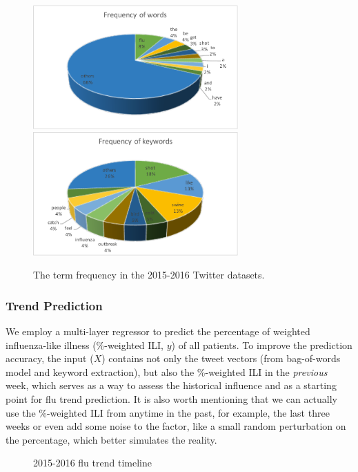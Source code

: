 \documentclass[12pt, oneside]{article}
\begin{document}
\begin{figure}[h]
    \centering
    \includegraphics[width=0.7\textwidth]{fig1b}
    \includegraphics[width=0.7\textwidth]{fig1a}
    \caption{The term frequency in the 2015-2016 Twitter datasets. }
    \label{fig:1}
\end{figure}

\subsubsection{Trend Prediction}

We employ a multi-layer regressor to predict the percentage of weighted influenza-like illness (\%-weighted ILI, $y$) of all patients.
To improve the prediction accuracy, the input ($X$) contains not only the tweet vectors (from bag-of-words model and keyword extraction),
but also the \%-weighted ILI in the \textit{previous} week, which serves as a way to assess the historical influence and as a starting point
for flu trend prediction. It is also worth mentioning that we can actually use the \%-weighted ILI from anytime in the past, for example, the last three weeks
or even add some noise to the factor, like a small random perturbation on the percentage, which better simulates the reality.

\begin{figure}[h]
  \centering
  \scalebox{0.85}{}
  \caption{2015-2016 flu trend timeline}
  \label{figure:2}
\end{figure}
\end{document}
